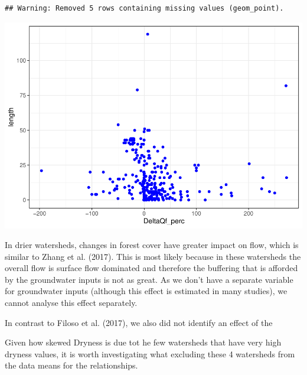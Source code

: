 \documentclass[]{elsarticle} %
\begin{document}
\begin{verbatim}
## Warning: Removed 5 rows containing missing values (geom_point).
\end{verbatim}

\includegraphics{Forest_and_Water_files/figure-latex/unnamed-chunk-25-1.pdf}

In drier watersheds, changes in forest cover have greater impact on
flow, which is similar to Zhang et al. (2017). This is most likely
because in these watersheds the overall flow is surface flow dominated
and therefore the buffering that is afforded by the groundwater inputs
is not as great. As we don't have a separate variable for groundwater
inputs (although this effect is estimated in many studies), we cannot
analyse this effect separately.

In contrast to Filoso et al. (2017), we also did not identify an effect
of the

Given how skewed Dryness is due tot he few watersheds that have very
high dryness values, it is worth investigating what excluding these 4
watersheds from the data means for the relationships.

\newpage
\end{document}
